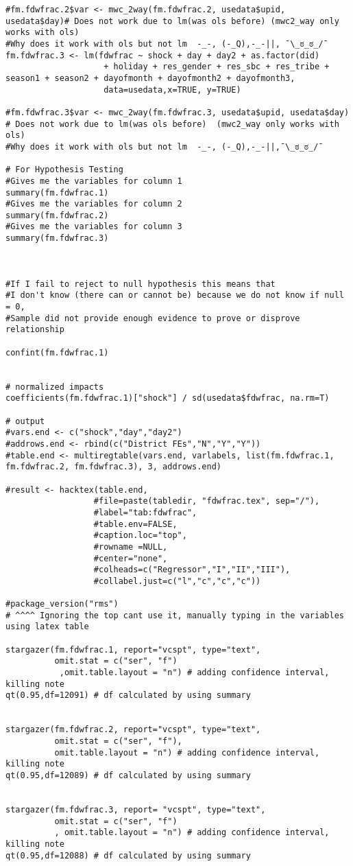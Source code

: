 \documentclass{article}
\begin{document}
\begin{verbatim}
#fm.fdwfrac.2$var <- mwc_2way(fm.fdwfrac.2, usedata$upid, usedata$day)# Does not work due to lm(was ols before) (mwc2_way only works with ols) 
#Why does it work with ols but not lm  -_-, (-_Q),-_-||, ¯\_ಠ_ಠ_/¯
fm.fdwfrac.3 <- lm(fdwfrac ~ shock + day + day2 + as.factor(did)
                    + holiday + res_gender + res_sbc + res_tribe + season1 + season2 + dayofmonth + dayofmonth2 + dayofmonth3, 
                    data=usedata,x=TRUE, y=TRUE)

#fm.fdwfrac.3$var <- mwc_2way(fm.fdwfrac.3, usedata$upid, usedata$day)  # Does not work due to lm(was ols before)  (mwc2_way only works with ols) 
#Why does it work with ols but not lm  -_-, (-_Q),-_-||,¯\_ಠ_ಠ_/¯

# For Hypothesis Testing 
#Gives me the variables for column 1
summary(fm.fdwfrac.1)
#Gives me the variables for column 2
summary(fm.fdwfrac.2)
#Gives me the variables for column 3
summary(fm.fdwfrac.3)



#If I fail to reject to null hypothesis this means that 
#I don't know (there can or cannot be) because we do not know if null = 0, 
#Sample did not provide enough evidence to prove or disprove relationship

confint(fm.fdwfrac.1)


# normalized impacts
coefficients(fm.fdwfrac.1)["shock"] / sd(usedata$fdwfrac, na.rm=T)

# output
#vars.end <- c("shock","day","day2")
#addrows.end <- rbind(c("District FEs","N","Y","Y"))
#table.end <- multiregtable(vars.end, varlabels, list(fm.fdwfrac.1, fm.fdwfrac.2, fm.fdwfrac.3), 3, addrows.end)

#result <- hacktex(table.end, 
                  #file=paste(tabledir, "fdwfrac.tex", sep="/"),
                  #label="tab:fdwfrac",
                  #table.env=FALSE,
                  #caption.loc="top",
                  #rowname =NULL,
                  #center="none",
                  #colheads=c("Regressor","I","II","III"),
                  #collabel.just=c("l","c","c","c"))

#package_version("rms")
# ^^^^ Ignoring the top cant use it, manually typing in the variables using latex table

stargazer(fm.fdwfrac.1, report="vcspt", type="text",
          omit.stat = c("ser", "f")
           ,omit.table.layout = "n") # adding confidence interval, killing note
qt(0.95,df=12091) # df calculated by using summary 


stargazer(fm.fdwfrac.2, report="vcspt", type="text",
          omit.stat = c("ser", "f"),
          omit.table.layout = "n") # adding confidence interval, killing note
qt(0.95,df=12089) # df calculated by using summary 


stargazer(fm.fdwfrac.3, report= "vcspt", type="text",
          omit.stat = c("ser", "f")
          , omit.table.layout = "n") # adding confidence interval, killing note
qt(0.95,df=12088) # df calculated by using summary 





\end{verbatim}
\end{document}
